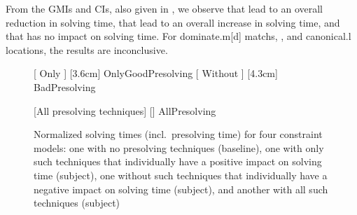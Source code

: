 %
From the \glspl{GMI} and \glspl{CI}, also given in
, we observe
that  lead to an
overall reduction in solving time, that
 lead to an
overall increase in solving time, and that
 has no impact on solving time.
%
For \gls{dominate.m}[d] \glspl{match},
,
and \gls{canonical.l} \glspl{location}, the results are inconclusive.


\begin{figure}
  \centering%

                      [%
                        Only %
                      ]%
                      [3.6cm]%
                      {OnlyGoodPresolving}%
  \hfill%
                      [%
                        Without %
                      ]%
                      [4.3cm]%
                      {BadPresolving}%

  \vspace{\betweensubfigures}

                      [All presolving techniques]%
                      [\linewidth]%
                      {AllPresolving}%

  \caption[%
            Plot for evaluating the impact on solving time made by different
            combinations of presolving techniques%
          ]%
          {%
            Normalized solving times (incl.\ presolving time) for four
            constraint models: one with no presolving techniques (baseline), one
            with only such techniques that individually have a positive impact
            on solving time (subject), one without such techniques that
            individually have a negative impact on solving time (subject), and
            another with all such techniques (subject)%
          }
\end{figure}

